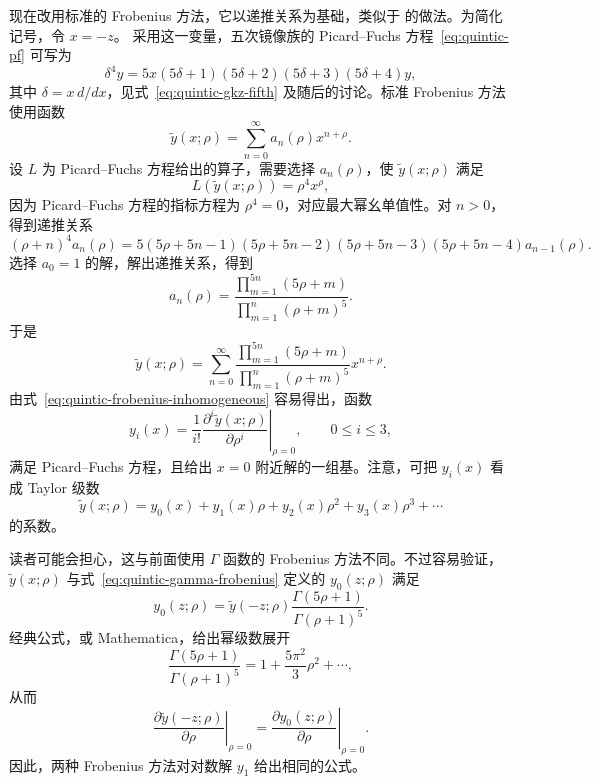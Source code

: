 \begin{example}[续]
现在改用标准的 Frobenius 方法，它以递推关系为基础，类似于  的做法。为简化记号，令 $x=-z$。
采用这一变量，五次镜像族的 Picard--Fuchs 方程~\eqref{eq:quintic-pf} 可写为
\[
\delta^4y=5x(5\delta+1)(5\delta+2)(5\delta+3)(5\delta+4)y,
\]
其中 $\delta=x\,d/dx$，见式~\eqref{eq:quintic-gkz-fifth} 及随后的讨论。标准 Frobenius 方法  使用函数
\[
\widetilde y(x;\rho)=\sum_{n=0}^\infty a_n(\rho)x^{n+\rho}.
\]
设 $L$ 为 Picard--Fuchs 方程给出的算子，需要选择 $a_n(\rho)$，使 $\widetilde y(x;\rho)$ 满足
\begin{equation}\label{eq:quintic-frobenius-inhomogeneous}
L(\widetilde y(x;\rho))=\rho^4x^\rho,
\end{equation}
因为 Picard--Fuchs 方程的指标方程为 $\rho^4=0$，对应最大幂幺单值性。对 $n>0$，得到递推关系
\[
(\rho+n)^4a_n(\rho)
=5(5\rho+5n-1)(5\rho+5n-2)(5\rho+5n-3)(5\rho+5n-4)a_{n-1}(\rho).
\]
选择 $a_0=1$ 的解，解出递推关系，得到
\[
a_n(\rho)=\frac{\prod_{m=1}^{5n}(5\rho+m)}
{\prod_{m=1}^n(\rho+m)^5}.
\]
于是
\begin{equation}\label{eq:quintic-product-frobenius}
\widetilde y(x;\rho)=\sum_{n=0}^\infty
\frac{\prod_{m=1}^{5n}(5\rho+m)}{\prod_{m=1}^n(\rho+m)^5}x^{n+\rho}.
\end{equation}
由式~\eqref{eq:quintic-frobenius-inhomogeneous} 容易得出，函数
\begin{equation}\label{eq:quintic-frobenius-basis}
y_i(x)=\left.\frac1{i!}\frac{\partial^i\widetilde y(x;\rho)}
{\partial\rho^i}\right|_{\rho=0},\qquad0\leq i\leq3,
\end{equation}
满足 Picard--Fuchs 方程，且给出 $x=0$ 附近解的一组基。注意，可把 $y_i(x)$ 看成 Taylor 级数
\begin{equation}\label{eq:quintic-frobenius-expansion}
\widetilde y(x;\rho)=y_0(x)+y_1(x)\rho+y_2(x)\rho^2+y_3(x)\rho^3+\cdots
\end{equation}
的系数。

读者可能会担心，这与前面使用 $\Gamma$ 函数的 Frobenius 方法不同。不过容易验证，$\widetilde y(x;\rho)$ 与式~\eqref{eq:quintic-gamma-frobenius} 定义的 $y_0(z;\rho)$ 满足
\[
y_0(z;\rho)=\widetilde y(-z;\rho)\frac{\Gamma(5\rho+1)}{\Gamma(\rho+1)^5}.
\]
经典公式，或 Mathematica，给出幂级数展开
\[
\frac{\Gamma(5\rho+1)}{\Gamma(\rho+1)^5}
=1+\frac{5\pi^2}{3}\rho^2+\cdots,
\]
从而
\[
\left.\frac{\partial\widetilde y(-z;\rho)}{\partial\rho}\right|_{\rho=0}
=\left.\frac{\partial y_0(z;\rho)}{\partial\rho}\right|_{\rho=0}.
\]
因此，两种 Frobenius 方法对对数解 $y_1$ 给出相同的公式。


\end{example}
